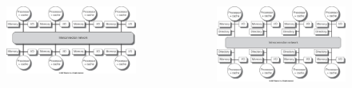 \documentclass{beamer}
\begin{document}
\begin{frame}
\begin{columns}[c]
\begin{figure}
\includegraphics[width=\linewidth,right]{distributed_mem.jpg}
\end{figure}

\begin{figure}
\includegraphics[width=\linewidth,right]{hybrid_mem.jpg}
\end{figure}

\end{columns}

\end{frame}


\fi
\end{document}
